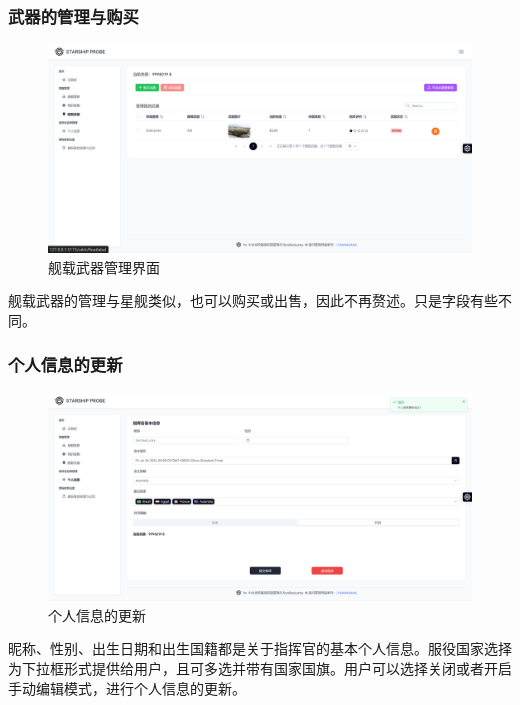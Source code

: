 \documentclass{base}
\begin{document}
\subsubsection{武器的管理与购买}

\begin{figure}[H]
	\centering
	\includegraphics[width=\linewidth]{images/WeaponPage}
	\caption{舰载武器管理界面}
	\label{fig:weaponpage}
\end{figure}

舰载武器的管理与星舰类似，也可以购买或出售，因此不再赘述。只是字段有些不同。

\subsubsection{个人信息的更新}

\begin{figure}[H]
	\centering
	\includegraphics[width=\linewidth]{images/PersonalInformation}
	\caption{个人信息的更新}
	\label{fig:personalinformation}
\end{figure}


昵称、性别、出生日期和出生国籍都是关于指挥官的基本个人信息。服役国家选择为下拉框形式提供给用户，且可多选并带有国家国旗。用户可以选择关闭或者开启手动编辑模式，进行个人信息的更新。
\end{document}

